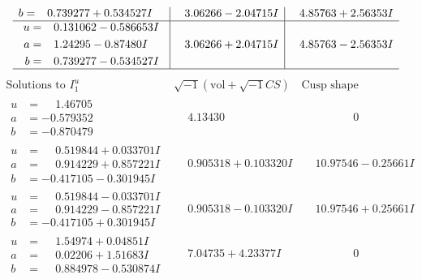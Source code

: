 \documentclass[1p]{elsarticle_modified}
\theoremstyle{definition}
\newcommand{\I}{\sqrt{-1}}
\begin{document}
$$\begin{array}{c|c|c}
\begin{aligned}
b &= \phantom{-}0.739277 + 0.534527 I\end{aligned}
 & \phantom{-}3.06266 - 2.04715 I & \phantom{-}4.85763 + 2.56353 I \\ \hline\begin{aligned}
u &= \phantom{-}0.131062 - 0.586653 I \\
a &= \phantom{-}1.24295 - 0.87480 I \\
b &= \phantom{-}0.739277 - 0.534527 I\end{aligned}
 & \phantom{-}3.06266 + 2.04715 I & \phantom{-}4.85763 - 2.56353 I\\
 \hline 
 \end{array}$$\newpage$$\begin{array}{c|c|c}  
\text{Solutions to }I^u_{1}& \I (\text{vol} + \sqrt{-1}CS) & \text{Cusp shape}\\
 \hline 
\begin{aligned}
u &= \phantom{-}1.46705\phantom{ +0.000000I} \\
a &= -0.579352\phantom{ +0.000000I} \\
b &= -0.870479\phantom{ +0.000000I}\end{aligned}
 & \phantom{-}4.13430\phantom{ +0.000000I} & \phantom{-0.000000 } 0 \\ \hline\begin{aligned}
u &= \phantom{-}0.519844 + 0.033701 I \\
a &= \phantom{-}0.914229 + 0.857221 I \\
b &= -0.417105 - 0.301945 I\end{aligned}
 & \phantom{-}0.905318 + 0.103320 I & \phantom{-}10.97546 - 0.25661 I \\ \hline\begin{aligned}
u &= \phantom{-}0.519844 - 0.033701 I \\
a &= \phantom{-}0.914229 - 0.857221 I \\
b &= -0.417105 + 0.301945 I\end{aligned}
 & \phantom{-}0.905318 - 0.103320 I & \phantom{-}10.97546 + 0.25661 I \\ \hline\begin{aligned}
u &= \phantom{-}1.54974 + 0.04851 I \\
a &= \phantom{-}0.02206 + 1.51683 I \\
b &= \phantom{-}0.884978 - 0.530874 I\end{aligned}
 & \phantom{-}7.04735 + 4.23377 I & \phantom{-0.000000 } 0 \\ \hline\begin{aligned}

\end{aligned}
\end{array}$$
\end{document}

